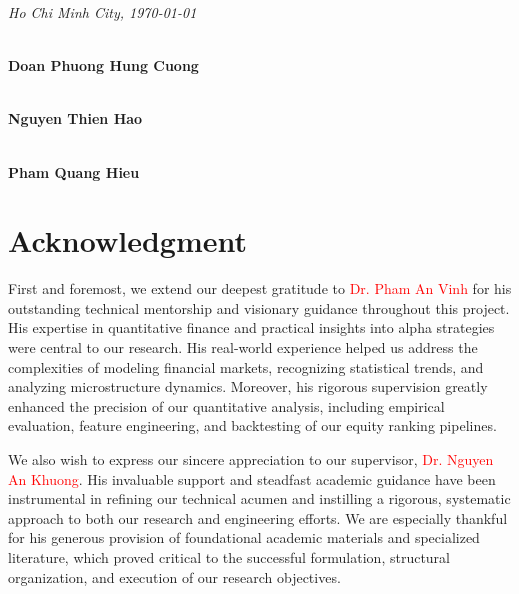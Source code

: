 \begin{flushright}
	\textit{Ho Chi Minh City, \today}
\end{flushright}

\vspace{3cm}

\noindent
\begin{minipage}{0.35\textwidth}
	\centering
	\hrulefill \\
	\vspace{0.2cm}
	\textbf{Doan Phuong Hung Cuong}
\end{minipage}
\hfill
\begin{minipage}{0.3\textwidth}
	\centering
	\hrulefill \\
	\vspace{0.2cm}
	\textbf{Nguyen Thien Hao}
\end{minipage}
\hfill
\begin{minipage}{0.3\textwidth}
	\centering
	\hrulefill \\
	\vspace{0.2cm}
	\textbf{Pham Quang Hieu}
\end{minipage}
\clearpage

\part*{Acknowledgment} \label{part:acknowledgment}
First and foremost, we extend our deepest gratitude to \textcolor{red}{Dr. Pham An Vinh} for his outstanding technical mentorship and visionary guidance throughout this project. His expertise in quantitative finance and practical insights into alpha strategies were central to our research. His real-world experience helped us address the complexities of modeling financial markets, recognizing statistical trends, and analyzing microstructure dynamics. Moreover, his rigorous supervision greatly enhanced the precision of our quantitative analysis, including empirical evaluation, feature engineering, and backtesting of our equity ranking pipelines.

\medskip

We also wish to express our sincere appreciation to our supervisor, \textcolor{red}{Dr. Nguyen An Khuong}. His invaluable support and steadfast academic guidance have been instrumental in refining our technical acumen and instilling a rigorous, systematic approach to both our research and engineering efforts. We are especially thankful for his generous provision of foundational academic materials and specialized literature, which proved critical to the successful formulation, structural organization, and execution of our research objectives.

